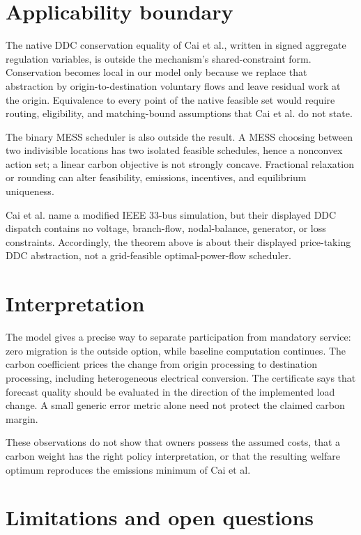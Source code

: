 \documentclass{article}
\begin{document}
\section{Applicability boundary}

The native DDC conservation equality of Cai et al., written in signed aggregate regulation variables, is outside the mechanism's shared-constraint form. Conservation becomes local in our model only because we replace that abstraction by origin-to-destination voluntary flows and leave residual work at the origin. Equivalence to every point of the native feasible set would require routing, eligibility, and matching-bound assumptions that Cai et al. do not state.

The binary MESS scheduler is also outside the result. A MESS choosing between two indivisible locations has two isolated feasible schedules, hence a nonconvex action set; a linear carbon objective is not strongly concave. Fractional relaxation or rounding can alter feasibility, emissions, incentives, and equilibrium uniqueness.

Cai et al. name a modified IEEE 33-bus simulation, but their displayed DDC dispatch contains no voltage, branch-flow, nodal-balance, generator, or loss constraints. Accordingly, the theorem above is about their displayed price-taking DDC abstraction, not a grid-feasible optimal-power-flow scheduler.

\section{Interpretation}

The model gives a precise way to separate participation from mandatory service: zero migration is the outside option, while baseline computation continues. The carbon coefficient prices the change from origin processing to destination processing, including heterogeneous electrical conversion. The certificate says that forecast quality should be evaluated in the direction of the implemented load change. A small generic error metric alone need not protect the claimed carbon margin.

These observations do not show that owners possess the assumed costs, that a carbon weight has the right policy interpretation, or that the resulting welfare optimum reproduces the emissions minimum of Cai et al.

\section{Limitations and open questions}
\end{document}
